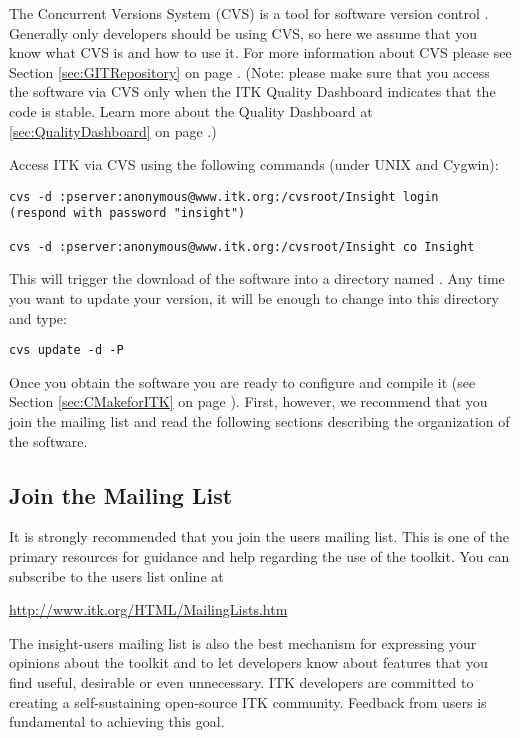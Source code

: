 
The Concurrent Versions System (CVS) is a tool for software version control
\cite{Fogel1999}. Generally only developers should be using CVS, so here we 
assume that you know what CVS is and how to use it.  For more information
about CVS please see Section \ref{sec:GITRepository} on page 
\pageref{sec:GITRepository}. (Note: please make sure that you access the 
software via CVS only when the ITK Quality Dashboard indicates that the 
code is stable. Learn more about the Quality Dashboard at
\ref{sec:QualityDashboard} on page \pageref{sec:QualityDashboard}.)

Access ITK via CVS using the following commands (under UNIX and Cygwin): 
\begin{verbatim}
cvs -d :pserver:anonymous@www.itk.org:/cvsroot/Insight login
(respond with password "insight")

cvs -d :pserver:anonymous@www.itk.org:/cvsroot/Insight co Insight
\end{verbatim}

This will trigger the download of the software into a directory named
.  Any time you want to update your version, it will be enough to
change into this directory  and type:
\begin{verbatim}
cvs update -d -P
\end{verbatim}

Once you obtain the software you are ready to configure and compile it (see
Section \ref{sec:CMakeforITK} on page \pageref{sec:CMakeforITK}). First,
however, we recommend that you join the mailing list and read the following
sections describing the organization of the software. 

\subsection{Join the Mailing List}
\label{sec:JoinMailList}


It is strongly recommended that you join the users mailing list. This is one
of the primary resources for guidance and help regarding the use of the 
toolkit. You can subscribe to the users list online at

\begin{center}
\url{http://www.itk.org/HTML/MailingLists.htm}
\end{center} 

The insight-users mailing list is also the best mechanism for expressing your
opinions about the toolkit and to let developers know about features that you
find useful, desirable or even unnecessary. ITK developers are committed to
creating a self-sustaining open-source ITK community. Feedback from users is
fundamental to achieving this goal.


